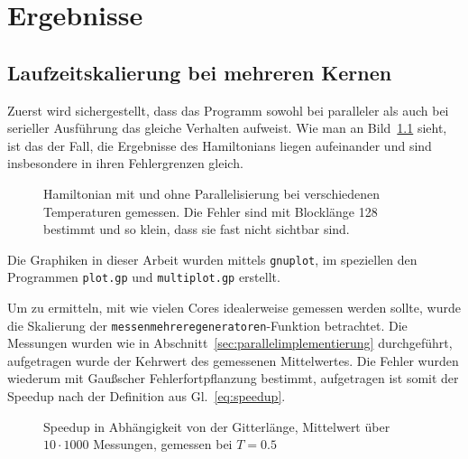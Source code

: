 	\chapter{Ergebnisse}
	\label{chap:ergebnisse}
	
	
	\section{Laufzeitskalierung bei mehreren Kernen}
	\label{sec:ergebnisparallel}
	Zuerst wird sichergestellt, dass das Programm sowohl bei paralleler als auch bei serieller Ausführung das gleiche Verhalten aufweist. Wie man an Bild~\ref{fig:vergleichham} sieht, ist das der Fall, die Ergebnisse des Hamiltonians liegen aufeinander und sind insbesondere in ihren Fehlergrenzen gleich.
	
	\begin{figure}[htbp]
		
		\caption[Hamiltonian mit und ohne Parallelisierung]{Hamiltonian mit und ohne Parallelisierung bei verschiedenen Temperaturen gemessen. Die Fehler sind mit Blocklänge 128 bestimmt und so klein, dass sie fast nicht sichtbar sind.}
		\label{fig:vergleichham}
	\end{figure}
	
	Die Graphiken in dieser Arbeit wurden mittels \texttt{gnuplot}\cite{gnuplotdoc}, im speziellen den Programmen \texttt{plot.gp} und \texttt{multiplot.gp} erstellt.
	
	Um zu ermitteln, mit wie vielen Cores idealerweise gemessen werden sollte, wurde die Skalierung der \texttt{messenmehreregeneratoren}-Funktion betrachtet. Die Messungen wurden wie in Abschnitt~\ref{sec:parallelimplementierung} durchgeführt, aufgetragen wurde der Kehrwert des gemessenen Mittelwertes. Die Fehler wurden wiederum mit Gaußscher Fehlerfortpflanzung bestimmt, aufgetragen ist somit der Speedup nach der Definition aus Gl.~\ref{eq:speedup}.%
	
	\begin{figure}[htbp]
		
		\caption[Speedup in Abhängigkeit von der Gitterlänge]{Speedup in Abhängigkeit von der Gitterlänge, Mittelwert über $10 \cdot 1000$ Messungen, gemessen bei $T=\num{0,5}$}
		\label{fig:skalierunglaenge}
	\end{figure}
	
